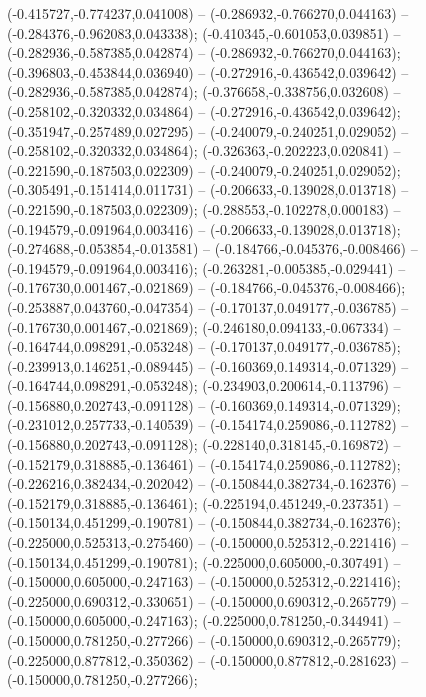  (-0.415727,-0.774237,0.041008) -- (-0.286932,-0.766270,0.044163) -- (-0.284376,-0.962083,0.043338);
 (-0.410345,-0.601053,0.039851) -- (-0.282936,-0.587385,0.042874) -- (-0.286932,-0.766270,0.044163);
 (-0.396803,-0.453844,0.036940) -- (-0.272916,-0.436542,0.039642) -- (-0.282936,-0.587385,0.042874);
 (-0.376658,-0.338756,0.032608) -- (-0.258102,-0.320332,0.034864) -- (-0.272916,-0.436542,0.039642);
 (-0.351947,-0.257489,0.027295) -- (-0.240079,-0.240251,0.029052) -- (-0.258102,-0.320332,0.034864);
 (-0.326363,-0.202223,0.020841) -- (-0.221590,-0.187503,0.022309) -- (-0.240079,-0.240251,0.029052);
 (-0.305491,-0.151414,0.011731) -- (-0.206633,-0.139028,0.013718) -- (-0.221590,-0.187503,0.022309);
 (-0.288553,-0.102278,0.000183) -- (-0.194579,-0.091964,0.003416) -- (-0.206633,-0.139028,0.013718);
 (-0.274688,-0.053854,-0.013581) -- (-0.184766,-0.045376,-0.008466) -- (-0.194579,-0.091964,0.003416);
 (-0.263281,-0.005385,-0.029441) -- (-0.176730,0.001467,-0.021869) -- (-0.184766,-0.045376,-0.008466);
 (-0.253887,0.043760,-0.047354) -- (-0.170137,0.049177,-0.036785) -- (-0.176730,0.001467,-0.021869);
 (-0.246180,0.094133,-0.067334) -- (-0.164744,0.098291,-0.053248) -- (-0.170137,0.049177,-0.036785);
 (-0.239913,0.146251,-0.089445) -- (-0.160369,0.149314,-0.071329) -- (-0.164744,0.098291,-0.053248);
 (-0.234903,0.200614,-0.113796) -- (-0.156880,0.202743,-0.091128) -- (-0.160369,0.149314,-0.071329);
 (-0.231012,0.257733,-0.140539) -- (-0.154174,0.259086,-0.112782) -- (-0.156880,0.202743,-0.091128);
 (-0.228140,0.318145,-0.169872) -- (-0.152179,0.318885,-0.136461) -- (-0.154174,0.259086,-0.112782);
 (-0.226216,0.382434,-0.202042) -- (-0.150844,0.382734,-0.162376) -- (-0.152179,0.318885,-0.136461);
 (-0.225194,0.451249,-0.237351) -- (-0.150134,0.451299,-0.190781) -- (-0.150844,0.382734,-0.162376);
 (-0.225000,0.525313,-0.275460) -- (-0.150000,0.525312,-0.221416) -- (-0.150134,0.451299,-0.190781);
 (-0.225000,0.605000,-0.307491) -- (-0.150000,0.605000,-0.247163) -- (-0.150000,0.525312,-0.221416);
 (-0.225000,0.690312,-0.330651) -- (-0.150000,0.690312,-0.265779) -- (-0.150000,0.605000,-0.247163);
 (-0.225000,0.781250,-0.344941) -- (-0.150000,0.781250,-0.277266) -- (-0.150000,0.690312,-0.265779);
 (-0.225000,0.877812,-0.350362) -- (-0.150000,0.877812,-0.281623) -- (-0.150000,0.781250,-0.277266);
